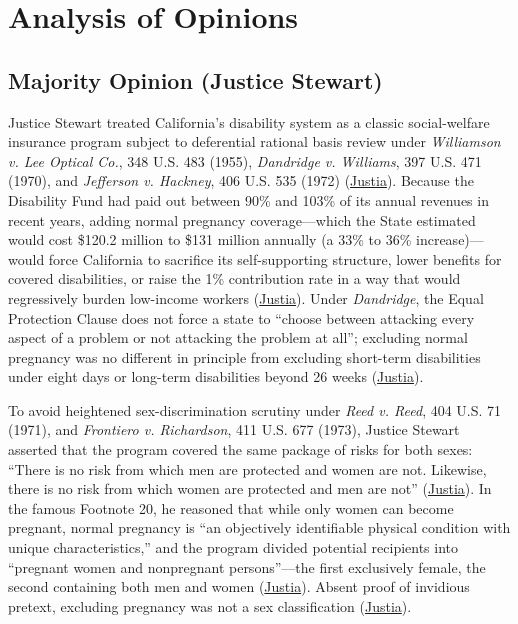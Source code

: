 \documentclass[12pt]{article}
\begin{document}
\section{Analysis of Opinions}

\subsection{Majority Opinion (Justice Stewart)}

Justice Stewart treated California's disability system as a classic social-welfare insurance program subject to deferential rational basis review under \textit{Williamson v. Lee Optical Co.}, 348 U.S. 483 (1955), \textit{Dandridge v. Williams}, 397 U.S. 471 (1970), and \textit{Jefferson v. Hackney}, 406 U.S. 535 (1972) (\href{https://supreme.justia.com/cases/federal/us/417/484/}{Justia}). Because the Disability Fund had paid out between 90\% and 103\% of its annual revenues in recent years, adding normal pregnancy coverage---which the State estimated would cost \$120.2 million to \$131 million annually (a 33\% to 36\% increase)---would force California to sacrifice its self-supporting structure, lower benefits for covered disabilities, or raise the 1\% contribution rate in a way that would regressively burden low-income workers (\href{https://supreme.justia.com/cases/federal/us/417/484/}{Justia}). Under \textit{Dandridge}, the Equal Protection Clause does not force a state to ``choose between attacking every aspect of a problem or not attacking the problem at all''; excluding normal pregnancy was no different in principle from excluding short-term disabilities under eight days or long-term disabilities beyond 26 weeks (\href{https://supreme.justia.com/cases/federal/us/417/484/}{Justia}).

To avoid heightened sex-discrimination scrutiny under \textit{Reed v. Reed}, 404 U.S. 71 (1971), and \textit{Frontiero v. Richardson}, 411 U.S. 677 (1973), Justice Stewart asserted that the program covered the same package of risks for both sexes: ``There is no risk from which men are protected and women are not. Likewise, there is no risk from which women are protected and men are not'' (\href{https://supreme.justia.com/cases/federal/us/417/484/}{Justia}). In the famous Footnote 20, he reasoned that while only women can become pregnant, normal pregnancy is ``an objectively identifiable physical condition with unique characteristics,'' and the program divided potential recipients into ``pregnant women and nonpregnant persons''---the first exclusively female, the second containing both men and women (\href{https://supreme.justia.com/cases/federal/us/417/484/}{Justia}). Absent proof of invidious pretext, excluding pregnancy was not a sex classification (\href{https://supreme.justia.com/cases/federal/us/417/484/}{Justia}).
\end{document}
